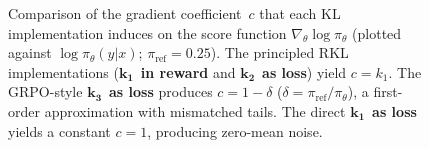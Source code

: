 \begin{figure}[t]
\caption{Comparison of the gradient coefficient~$c$
that each KL implementation induces on the score function
$\nabla_\theta\log\pi_\theta$
(plotted against $\log \pi_\theta(y|x)$; $\pi_{\mathrm{ref}} = 0.25$).
The principled RKL implementations
($\boldsymbol{k_1}$~\textbf{in reward} and
$\boldsymbol{k_2}$~\textbf{as loss}) yield $c = k_1$.
The GRPO-style $\boldsymbol{k_3}$~\textbf{as loss} produces
$c = 1 - \delta$ ($\delta = \pi_{\mathrm{ref}}/\pi_\theta$),
a first-order approximation with mismatched tails.
The direct $\boldsymbol{k_1}$~\textbf{as loss} yields
a constant $c = 1$, producing zero-mean noise.}
\label{fig:kl-coeff}
\end{figure}
